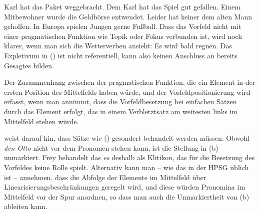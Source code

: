 \eal
\label{bsp-voranstellung-pragmatik}
\ex Karl hat das Paket weggebracht.
\ex Dem Karl hat das Spiel gut gefallen.
\ex Einem Mitbewohner wurde die Geldbörse entwendet.
\ex Leider hat keiner dem alten Mann geholfen.
\ex In Europa spielen Jungen gerne Fußball.
\zl
\largerpage
Dass das Vorfeld nicht mit einer pragmatischen Funktion wie Topik oder Fokus verbunden ist,
wird noch klarer, wenn man sich die Wetterverben ansieht:
\ea
Es wird bald regnen.
\z
Das Expletivum in () ist nicht referentiell, kann also keinen Anschluss an bereits Gesagtes bilden.

Der Zusammenhang zwischen der pragmatischen Funktion, die ein Element in der ersten Position des Mittelfelds
haben würde, und der Vorfeldpositionierung wird erfasst, wenn man annimmt, 
dass die Vorfeldbesetzung bei einfachen Sätzen durch das Element erfolgt,
das in einem Verbletztsatz am weitesten links im Mittelfeld stehen würde.

\citet[]{Frey2004a} weist darauf hin, dass Sätze wie () gesondert behandelt werden müssen:
\eal
{}
\zl
Obwohl \emph{den Otto} nicht vor dem Pronomen stehen kann, ist die Stellung in (b) unmarkiert.
Frey behandelt das \emph{es} deshalb als Klitikon, das für die Besetzung des Vorfeldes keine Rolle
spielt. Alternativ kann man -- wie das in der HPSG üblich ist -- annehmen, dass die Abfolge der Elemente
im Mittelfeld über Linearisierungsbeschränkungen geregelt wird, und diese würden Pronomina im Mittelfeld
vor der Spur anordnen, so dass man auch die Unmarkiertheit von (b) ableiten kann.%
%
%


